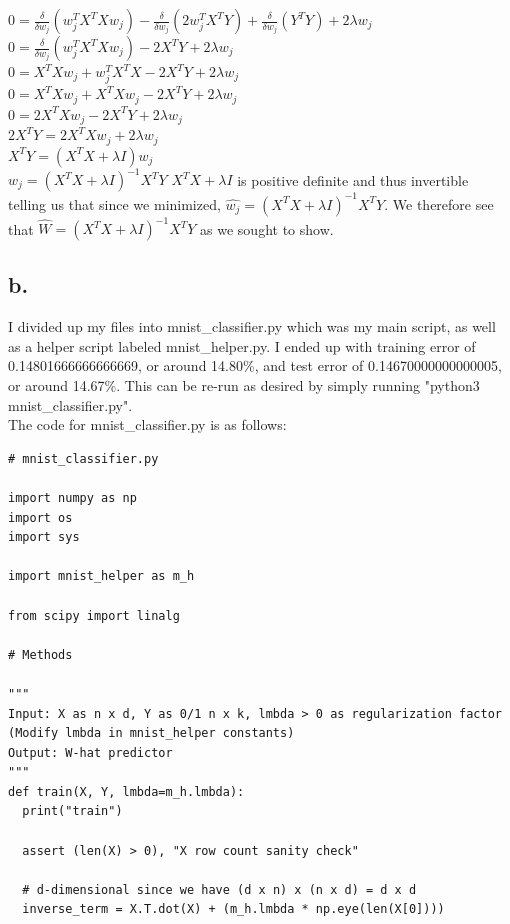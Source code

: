 \documentclass{article}
\newcommand{\1}{\mathbf{1}}
\begin{document}
{$0 = \frac{\delta }{\delta w_j}(w_j^TX^TXw_j) - \frac{\delta }{\delta w_j}(2w_j^TX^TY) + \frac{\delta }{\delta w_j}(Y^TY) +  2\lambda w_j$ \\
$0 = \frac{\delta }{\delta w_j}(w_j^TX^TXw_j) - 2X^TY +  2\lambda w_j$ \\
$0 = X^TXw_j + w_j^TX^TX - 2X^TY +  2\lambda w_j$ \\
$0 = X^TXw_j + X^TXw_j - 2X^TY +  2\lambda w_j$ \\
$0 = 2X^TXw_j - 2X^TY +  2\lambda w_j$ \\
$2X^TY = 2X^TXw_j +  2\lambda w_j$ \\
$X^TY = (X^TX + \lambda I)w_j$ \\ 
$w_j = (X^TX + \lambda I)^{-1}X^TY$ \hfill $X^TX + \lambda I$ is positive definite and thus invertible \\
telling us that since we minimized, $\widehat{w_j} = (X^TX + \lambda I)^{-1}X^TY$. We therefore see that $\widehat{W} = (X^TX + \lambda I)^{-1}X^TY$ as we sought to show.

\subsection*{b.}

I divided up my files into mnist\_classifier.py which was my main script, as well as a helper script labeled mnist\_helper.py. I ended up with training error of 0.14801666666666669, or around 14.80\%, and test error of 0.14670000000000005, or around 14.67\%. This can be re-run as desired by simply running "python3 mnist\_classifier.py". \\
The code for mnist\_classifier.py is as follows: \\

\begin{verbatim}
# mnist_classifier.py

import numpy as np
import os
import sys

import mnist_helper as m_h

from scipy import linalg

# Methods

"""
Input: X as n x d, Y as 0/1 n x k, lmbda > 0 as regularization factor
(Modify lmbda in mnist_helper constants)
Output: W-hat predictor
"""
def train(X, Y, lmbda=m_h.lmbda):
  print("train")

  assert (len(X) > 0), "X row count sanity check"

  # d-dimensional since we have (d x n) x (n x d) = d x d
  inverse_term = X.T.dot(X) + (m_h.lmbda * np.eye(len(X[0])))


\end{verbatim}}
\end{document}
